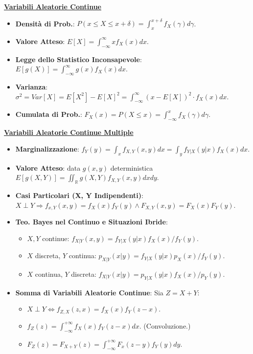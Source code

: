 \documentclass{article}
\begin{document}
\begin{multicols*}{3}
\textbf{\underline{Variabili Aleatorie Continue}}
\begin{itemize}
    \item \textbf{Densità di Prob.}: $P(x\leq X\leq x+\delta)=\int_{x}^{x+\delta}f_{X}(\gamma)d\gamma$.
    \item \textbf{Valore Atteso}: $E[X]=\int_{-\infty}^{\infty}xf_{X}(x)dx$.
    \item \textbf{Legge dello Statistico Inconsapevole}: $E[g(X)]=\int_{-\infty}^{\infty}g(x)f_{X}(x)dx$.
    \item \textbf{Varianza}: $\sigma^{2}=Var[X]=E[X^{2}]-E[X]^{2}=\int_{-\infty}^{\infty}(x-E[X])^{2}\cdot f_{X}(x)dx$.
    \item \textbf{Cumulata di Prob.}: $F_{X}(x)=P(X\leq x)=\int_{-\infty}^{x}f_{X}(\gamma)d\gamma$.
\end{itemize}

\textbf{\underline{Variabili Aleatorie Continue Multiple}}
\begin{itemize}
    \item \textbf{Marginalizzazione}: $f_{Y}(y)=\int_{x}f_{X,Y}(x,y)dx=\int_{y}f_{Y|X}(y|x)f_{X}(x)dx$.
    \item \textbf{Valore Atteso}: data $g(x,y)$ deterministica $E[g(X,Y)]=\iint_{\mathbb{R}}g(X,Y)f_{X,Y}(x,y)dxdy$.
    \item \textbf{Casi Particolari (X, Y Indipendenti)}: $X\perp Y\Rightarrow f_{x,Y}(x,y)=f_{X}(x)f_{Y}(y)\wedge F_{X,Y}(x,y)=F_{X}(x)F_{Y}(y)$.
    \item \textbf{Teo. Bayes nel Continuo e Situazioni Ibride}:
    \begin{itemize}
        \item $X,Y$ continue: $f_{X|Y}(x,y)=f_{Y|X}(y|x)f_{X}(x)/f_{Y}(y)$.
        \item $X$ discreta, $Y$ continua: $p_{X|Y}(x|y)=f_{Y|X}(y|x)p_{X}(x)/f_{Y}(y)$.
        \item $X$ continua, $Y$ discreta: $f_{X|Y}(x|y)=p_{Y|X}(y|x)f_{X}(x)/p_{Y}(y)$.
    \end{itemize}
    \item \textbf{Somma di Variabili Aleatorie Continue}: Sia $Z=X+Y$:
    \begin{itemize}
        \item $X\perp Y\Longleftrightarrow f_{Z,X}(z,x)=f_X(x)f_Y(z-x)$.
        \item $f_Z(z)=\int_{-\infty}^{+\infty}f_X(x)f_Y(z-x)dx$. (Convoluzione.)
        \item $F_Z(z)=F_{X+Y}(z)=\int_{-\infty}^{+\infty}F_x(z-y)f_Y(y)dy$.
    \end{itemize}
\end{itemize}


\end{multicols*}
\end{document}
